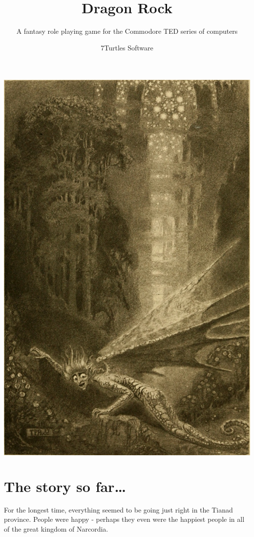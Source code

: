 \documentclass[12pt]{scrbook}
\begin{document}
\title{Dragon Rock}
\subtitle{A fantasy role playing game for the Commodore TED series of computers}
\author{7Turtles Software}
\maketitle

\includegraphics[width=\textwidth]{illustrations/ddungeon}


\chapter*{The story so far\dots}

For the longest time, everything seemed to be going just right in the Tianad province. People were happy - perhaps they even were the happiest people in all of the great kingdom of Narcordia.
\end{document}
